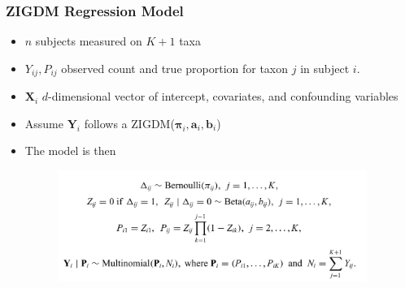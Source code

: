 \documentclass{beamer}
\begin{document}
\begin{frame}
\frametitle{ZIGDM Regression Model}
\begin{itemize}
  \item $n$ subjects measured on $K + 1$ taxa
  \item $Y_{ij}, P_{ij}$ observed count and true proportion for taxon $j$ in subject $i$.
  \item $\bm{X}_i$ $d$-dimensional vector of intercept, covariates, and confounding variables
  \item Assume $\bm{Y}_i$ follows a ZIGDM($\boldsymbol\pi_i, \bm{a}_i, \bm{b}_i$)
  \item The model is then
  \begin{figure}[!htb]
	\centering
	\includegraphics[width=0.95\textwidth]{img/2022.02.10_Zero_Inflated_generalized_Dirichlet_Multinomial-0ead4a93.png}
\end{figure}
\end{itemize}
\end{frame}
\end{document}

